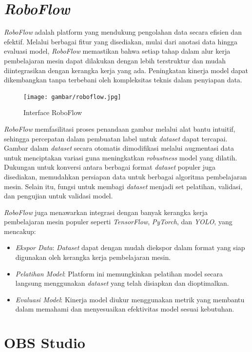 \section{\emph{RoboFlow}}
\label{sec:RoboFlow}

\emph{RoboFlow} adalah platform yang mendukung pengolahan data secara efisien dan efektif. Melalui berbagai fitur yang disediakan, mulai dari anotasi data hingga evaluasi model, \emph{RoboFlow} memastikan bahwa setiap tahap dalam alur kerja pembelajaran mesin dapat dilakukan dengan lebih terstruktur dan mudah diintegrasikan dengan kerangka kerja yang ada. Peningkatan kinerja model dapat dikembangkan tanpa terbebani oleh kompleksitas teknis dalam penyiapan data.

\begin{figure}[H]
  \centering
  \texttt{[image: gambar/roboflow.jpg]}
  \caption{Interface RoboFlow}
  \label{fig:roboflow}
\end{figure}

\emph{RoboFlow} memfasilitasi proses penandaan gambar melalui alat bantu intuitif, sehingga percepatan dalam pembuatan label untuk \emph{dataset} dapat tercapai. Gambar dalam \emph{dataset} secara otomatis dimodifikasi melalui augmentasi data untuk menciptakan variasi guna meningkatkan \emph{robustness} model yang dilatih. Dukungan untuk konversi antara berbagai format \emph{dataset} populer juga disediakan, memudahkan persiapan data untuk berbagai algoritma pembelajaran mesin. Selain itu, fungsi untuk membagi \emph{dataset} menjadi set pelatihan, validasi, dan pengujian untuk validasi model.

\emph{RoboFlow} juga menawarkan integrasi dengan banyak kerangka kerja pembelajaran mesin populer seperti \emph{TensorFlow}, \emph{PyTorch}, dan \emph{YOLO}, yang mencakup:

\begin{itemize}
    \item \emph{Ekspor Data}: \emph{Dataset} dapat dengan mudah diekspor dalam format yang siap digunakan oleh kerangka kerja pembelajaran mesin.
    \item \emph{Pelatihan Model}: Platform ini memungkinkan pelatihan model secara langsung menggunakan \emph{dataset} yang telah disiapkan dan dioptimalkan.
    \item \emph{Evaluasi Model}: Kinerja model diukur menggunakan metrik yang membantu dalam memahami dan menyesuaikan efektivitas model sesuai kebutuhan.
\end{itemize}

\section{OBS Studio}
\label{sec:OBS Studio}

